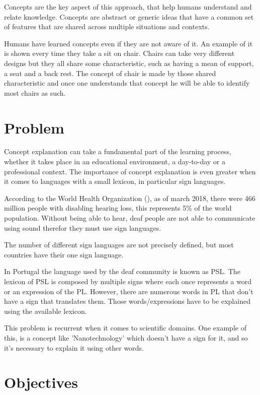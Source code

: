 Concepts are the key aspect of this approach, that help humans understand and relate knowledge.
Concepts are abstract or generic ideas that have a common set of features that are shared across multiple situations and contexts.

Humans have learned concepts even if they are not aware of it.
An example of it is shown every time they take a sit on chair.
Chairs can take very different designs but they all share some characteristic, such as having a mean of support, a seat and a back rest.
The concept of chair is made by those shared characteristic and once one understands that concept he will be able to identify most chairs as such.

\section{Problem}

Concept explanation can take a fundamental part of the learning process, whether it takes place in an educational environment, a day-to-day or a professional context.
The importance of concept explanation is even greater when it comes to languages with a small lexicon, in particular sign languages.

According to the World Health Organization (\citeyear{who_2018}), as of march 2018, there were 466 million people with disabling hearing loss, this represents 5\% of the world population.
Without being able to hear, deaf people are not able to communicate using sound therefor they must use sign languages.

The number of different sign languages are not precisely defined, but most countries have their one sign language.

In Portugal the language used by the deaf community is known as \gls{PSL}.
The lexicon of \gls{PSL} is composed by multiple signs where each once represents a word or an expression of the \gls{PL}.
However, there are numerous words in \gls{PL} that don't have a sign that translates them.
Those words/expressions have to be explained using the available lexicon.

This problem is recurrent when it comes to scientific domains.
One example of this, is a concept like 'Nanotechnology' which doesn't have a sign for it, and so it's necessary to explain it using other words.

\section{Objectives}

